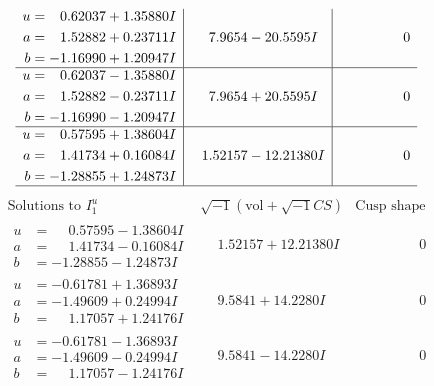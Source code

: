\documentclass[1p]{elsarticle_modified}
\theoremstyle{definition}
\newcommand{\I}{\sqrt{-1}}
\begin{document}
$$\begin{array}{c|c|c}
\begin{aligned}
u &= \phantom{-}0.62037 + 1.35880 I \\
a &= \phantom{-}1.52882 + 0.23711 I \\
b &= -1.16990 + 1.20947 I\end{aligned}
 & \phantom{-}7.9654 - 20.5595 I & \phantom{-0.000000 } 0 \\ \hline\begin{aligned}
u &= \phantom{-}0.62037 - 1.35880 I \\
a &= \phantom{-}1.52882 - 0.23711 I \\
b &= -1.16990 - 1.20947 I\end{aligned}
 & \phantom{-}7.9654 + 20.5595 I & \phantom{-0.000000 } 0 \\ \hline\begin{aligned}
u &= \phantom{-}0.57595 + 1.38604 I \\
a &= \phantom{-}1.41734 + 0.16084 I \\
b &= -1.28855 + 1.24873 I\end{aligned}
 & \phantom{-}1.52157 - 12.21380 I & \phantom{-0.000000 } 0\\
 \hline 
 \end{array}$$\newpage$$\begin{array}{c|c|c}  
\text{Solutions to }I^u_{1}& \I (\text{vol} + \sqrt{-1}CS) & \text{Cusp shape}\\
 \hline 
\begin{aligned}
u &= \phantom{-}0.57595 - 1.38604 I \\
a &= \phantom{-}1.41734 - 0.16084 I \\
b &= -1.28855 - 1.24873 I\end{aligned}
 & \phantom{-}1.52157 + 12.21380 I & \phantom{-0.000000 } 0 \\ \hline\begin{aligned}
u &= -0.61781 + 1.36893 I \\
a &= -1.49609 + 0.24994 I \\
b &= \phantom{-}1.17057 + 1.24176 I\end{aligned}
 & \phantom{-}9.5841 + 14.2280 I & \phantom{-0.000000 } 0 \\ \hline\begin{aligned}
u &= -0.61781 - 1.36893 I \\
a &= -1.49609 - 0.24994 I \\
b &= \phantom{-}1.17057 - 1.24176 I\end{aligned}
 & \phantom{-}9.5841 - 14.2280 I & \phantom{-0.000000 } 0 \\ \hline\begin{aligned}

\end{aligned}
\end{array}$$
\end{document}
